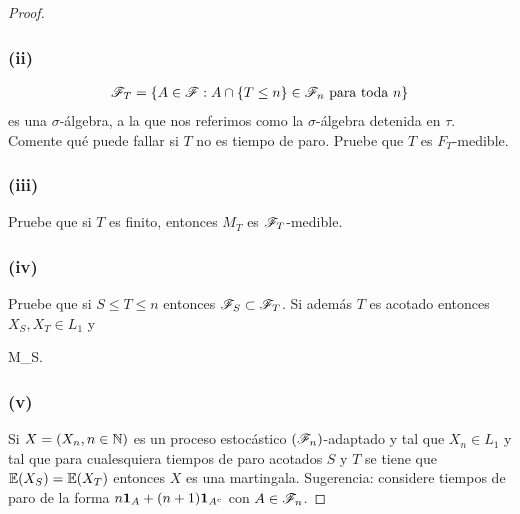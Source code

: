 \begin{proof}
                \subsubsection{(ii)}
                	\begin{align}
                		\mathscr{F}_T=\left\{ A\in\mathscr{F}:A\cap\left\{ T\leq n\right\} \in\mathscr{F}_n\text{ para toda } n\right\} 
                	\end{align}
                	es una $\sigma$-\'algebra, 
                	a la que nos referimos como la $\sigma$-\'algebra detenida en $\tau$. Comente qu\'e puede fallar si $T$ no es tiempo de paro. 
                	Pruebe que $T$ es $F_T$-medible. 
                
                \subsubsection{(iii)}
                	Pruebe que si $T$ es finito, entonces $M_T$ es $\mathscr{F}_T$-medible.
                
                \subsubsection{(iv)} 
                	Pruebe que si $S\leq T\leq n$ entonces $\mathscr{F}_S\subset\mathscr{F}_T$. Si adem\'as $T$ es acotado entonces $X_S,X_T\in L_1$ y 
                	\begin{esn}
	                	\leq M_S.
                	\end{esn}

                \subsubsection{(v)}
                	Si $X=\left( X_n,n\in\mathbb{N}\right) $ es un proceso estoc\'astico $\left( \mathscr{F}_n\right) $-adaptado y tal que $X_n\in L_1$ y tal que 
                	para cualesquiera tiempos de paro acotados $S$ y $T$ se tiene que $\mathbb{E}\! \left( X_S \right)=\mathbb{E}\! \left( X_T \right)$ entonces $X$ es una 
                	martingala. Sugerencia: considere tiempos de paro de la forma $n{\bf{1}}_{A}+(n+1){\bf{1}}_{A^c}$ con $A\in\mathscr{F}_n$.
\end{proof}
